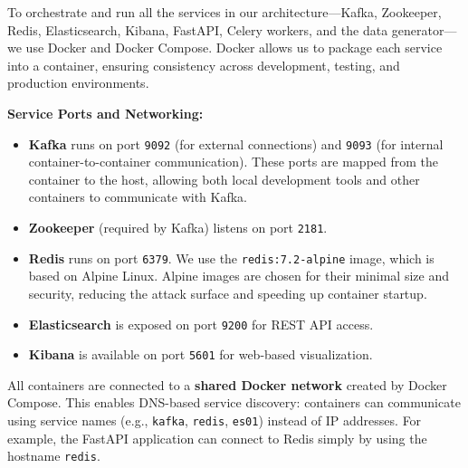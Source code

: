 To orchestrate and run all the services in our architecture—Kafka, Zookeeper, Redis, Elasticsearch, Kibana, FastAPI, Celery workers, and the data generator—we use Docker and Docker Compose. Docker allows us to package each service into a container, ensuring consistency across development, testing, and production environments.

\textbf{Service Ports and Networking:}
\begin{itemize}
    \item \textbf{Kafka} runs on port \texttt{9092} (for external connections) and \texttt{9093} (for internal container-to-container communication). These ports are mapped from the container to the host, allowing both local development tools and other containers to communicate with Kafka.
    \item \textbf{Zookeeper} (required by Kafka) listens on port \texttt{2181}.
    \item \textbf{Redis} runs on port \texttt{6379}. We use the \texttt{redis:7.2-alpine} image, which is based on Alpine Linux. Alpine images are chosen for their minimal size and security, reducing the attack surface and speeding up container startup.
    \item \textbf{Elasticsearch} is exposed on port \texttt{9200} for REST API access.
    \item \textbf{Kibana} is available on port \texttt{5601} for web-based visualization.
\end{itemize}

All containers are connected to a \textbf{shared Docker network} created by Docker Compose. This enables DNS-based service discovery: containers can communicate using service names (e.g., \texttt{kafka}, \texttt{redis}, \texttt{es01}) instead of IP addresses. For example, the FastAPI application can connect to Redis simply by using the hostname \texttt{redis}.

